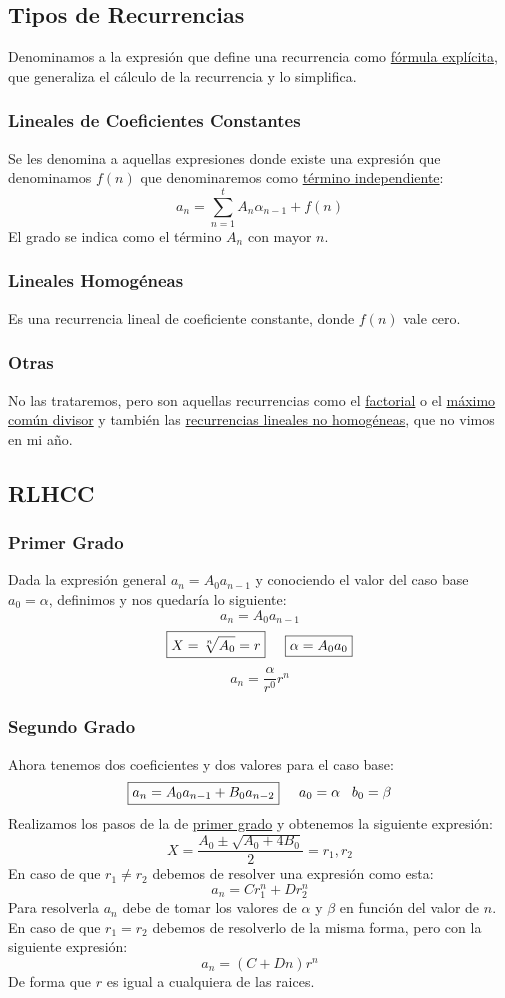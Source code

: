 \subsection{Tipos de Recurrencias}
 Denominamos a la expresión que define una recurrencia como \underline{fórmula explícita}, que generaliza el cálculo de la recurrencia y lo simplifica.
\subsubsection{Lineales de Coeficientes Constantes}
 Se les denomina a aquellas expresiones donde existe una expresión que denominamos \(f(n)\) que denominaremos como \underline{término independiente}:
\[
        a_n = \sum_{n=1}^tA_n \alpha_{n-1} + f(n)
\]
 El grado se indica como el término \(A_n\) con mayor \(n\).

\subsubsection{Lineales Homogéneas}
 Es una recurrencia lineal de coeficiente constante, donde \(f(n)\) vale cero.
\subsubsection{Otras}
 No las trataremos, pero son aquellas recurrencias como el \underline{factorial} o el \underline{máximo común divisor} y también las \underline{recurrencias lineales no homogéneas}, que no vimos en mi año.
\subsection{RLHCC}
\subsubsection{Primer Grado}
 Dada la expresión general \(a_n = A_0 a_{n-1}\) y conociendo el valor del caso base \(a_0 = \alpha\), definimos y nos quedaría lo siguiente:
\[
        \boxed{a_n = A_0 a_{n-1}}
\]
\[
        \boxed{X = \sqrt[n]{A_0} = r} \hspace{5mm} \boxed{\alpha = A_0 a_0}
\]
\[
        \boxed{a_n = \frac{\alpha}{r^0}r^n}
\]
\subsubsection{Segundo Grado}
 Ahora tenemos dos coeficientes y dos valores para el caso base:
\[
        \boxed{a_n = A_0 a_{n-1} + B_0 a_{n-2}} \hspace{5mm} a_0 = \alpha \hspace{3mm} b_0 = \beta
\]
 Realizamos los pasos de la de \underline{primer grado} y obtenemos la siguiente expresión:
\[
        \boxed{X = \frac{A_0 \pm \sqrt{A_0 +4B_0}}{2} = r_1,r_2}
\]
 En caso de que \(r_1 \neq r_2\) debemos de resolver una expresión como esta:
\[
        \boxed{a_n = Cr^n_1 +Dr_2^n}
\]
 Para resolverla \(a_n\) debe de tomar los valores de \(\alpha\) y \(\beta\) en función del valor de \(n\).\\
En caso de que \(r_1 = r_2\) debemos de resolverlo de la misma forma, pero con la siguiente expresión:
\[
        \boxed{ a_n = (C+Dn)r^n}
\]
 De forma que \(r\) es igual a cualquiera de las raices.